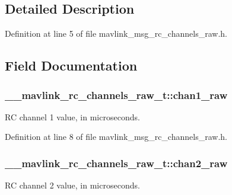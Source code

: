 \subsection{Detailed Description}


Definition at line 5 of file mavlink\-\_\-msg\-\_\-rc\-\_\-channels\-\_\-raw.\-h.



\subsection{Field Documentation}
\hypertarget{struct____mavlink__rc__channels__raw__t_a61bd698c061cfaa1da0b02d3ee390f4e}{
\subsubsection[{chan1\-\_\-raw}]{ \-\_\-\-\_\-mavlink\-\_\-rc\-\_\-channels\-\_\-raw\-\_\-t\-::chan1\-\_\-raw}}\label{struct____mavlink__rc__channels__raw__t_a61bd698c061cfaa1da0b02d3ee390f4e}


R\-C channel 1 value, in microseconds. 



Definition at line 8 of file mavlink\-\_\-msg\-\_\-rc\-\_\-channels\-\_\-raw.\-h.

\hypertarget{struct____mavlink__rc__channels__raw__t_a87484f764dc99860781a6a29a07f9a7a}{
\subsubsection[{chan2\-\_\-raw}]{ \-\_\-\-\_\-mavlink\-\_\-rc\-\_\-channels\-\_\-raw\-\_\-t\-::chan2\-\_\-raw}}\label{struct____mavlink__rc__channels__raw__t_a87484f764dc99860781a6a29a07f9a7a}


R\-C channel 2 value, in microseconds. 



